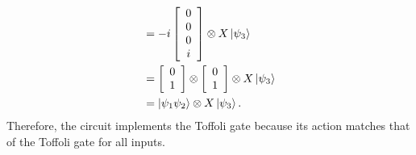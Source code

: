 \documentclass[a4paper,12pt]{article}
\begin{document}
\begin{enumerate}
\begin{align*}
            &= -i \left[ \begin{array}{c}
                    0 \\
                    0 \\
                    0 \\
                    i
            \end{array} \right]
            \otimes X\ket{\psi_3} \\
            &= \left[ \begin{array}{c}
                    0 \\
                    1
            \end{array} \right]
            \otimes
            \left[ \begin{array}{c}
                    0 \\
                    1
            \end{array} \right]
            \otimes X \ket{\psi_3} \\
            &= \ket{\psi_1 \psi_2} \otimes X \ket{\psi_3}.
        \end{align*}
        Therefore, the circuit implements the Toffoli gate because its action matches that of the Toffoli gate for all inputs.
            

\end{enumerate}
\end{document}
